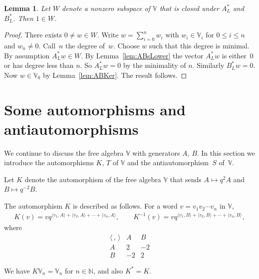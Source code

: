 \documentclass[pdftex]{sigma}
\numberwithin{equation}{section}
\newtheorem{Lemma}[Theorem]{Lemma}
\begin{document}
\begin{Lemma}\label{lem:ABirred}
Let $W$ denote a nonzero subspace of $\mathbb V$ that is closed under
$A^*_L$ and $B^*_L$. Then $1 \in W$.
\end{Lemma}
\begin{proof} There exists $0 \not=w \in W$. Write $w = \sum\limits_{i=0}^n w_i$ with $w_i \in \mathbb V_i$ for $0 \leq i \leq n$ and $w_n \not=0$. Call~$n$ the degree of~$w$. Choose $w$ such that this degree is minimal. By assumption $A^*_L w \in W$. By Lemma~\ref{lem:ABsLower} the vector
$A^*_Lw$ is either~0 or has degree less than $n$. So $A^*_Lw=0$ by the minimality of $n$.
Similarly $B^*_Lw=0$. Now $w \in \mathbb V_0$ by Lemma~\ref{lem:ABKer}. The result follows.
\end{proof}

\section{Some automorphisms and antiautomorphisms}\label{section5}

We continue to discuss the free algebra $\mathbb V$ with generators $A$, $B$. In this section we introduce
the automorphisms $K$, $T$ of $\mathbb V$ and the antiautomorphism~$S$ of~$\mathbb V$.
\begin{Definition}\label{def:Kdef} Let $K$ denote the automorphism of the free algebra $\mathbb V$
that sends $A\mapsto q^2 A$ and $B\mapsto q^{-2}B$.
\end{Definition}

The automorphism $K$ is described as follows. For a word $v=v_1 v_2 \cdots v_n$ in $\mathbb V$,
\begin{gather*}
K(v) =v q^{\langle v_1, A\rangle+
\langle v_2, A\rangle+ \cdots+
\langle v_n, A\rangle},
\qquad
K^{-1}(v) =
v q^{\langle v_1, B\rangle+
\langle v_2, B\rangle+ \cdots+
\langle v_n, B\rangle
},
\end{gather*}
where
\[
\begin{array}{c|cc}
\langle\,,\,\rangle & A & B
 \\ \hline
A &2 & -2 \\
B & -2 & 2
 \end{array}
\]

We have $K\mathbb V_n = \mathbb V_n $ for $n \in \mathbb N$, and also $K^*=K$.
\end{document}
